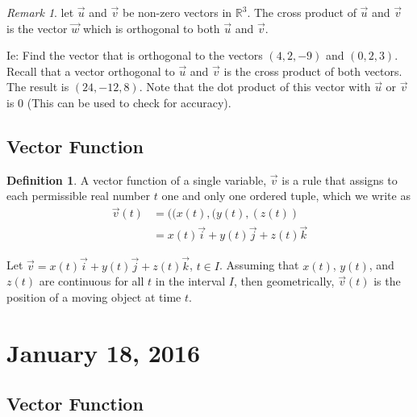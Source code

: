\documentclass[11pt]{article}
\theoremstyle{plain} %
\theoremstyle{definition}
\newtheorem*{definition}{Definition} %
\theoremstyle{example}
\theoremstyle{remark}
\newtheorem*{remark}{Remark}
\begin{document}
\begin{remark}
let $\vec{u}$ and $\vec{v}$ be non-zero vectors in $\mathbb R^3$. The cross product of $\vec{u}$ and $\vec{v}$ is the vector $\vec{w}$ which is orthogonal to both $\vec{u}$ and $\vec{v}$.
\end{remark}

Ie: Find the vector that is orthogonal to the vectors $(4, 2, -9)$ and $(0,2,3)$. Recall that a vector orthogonal to $\vec{u}$ and $\vec{v}$ is the cross product of both vectors. The result is $(24, -12,8 )$. Note that the dot product of this vector with $\vec{u}$ or $\vec{v}$ is 0 (This can be used to check for accuracy).



\subsection{Vector Function}

\begin{definition}
A vector function of a single variable, $\vec{v}$ is a rule that assigns to each permissible real number $t$ one and only one ordered tuple, which we write as 
\begin{align*}
	\vec{v}(t) &= ((x(t),(y(t),(z(t)) \\
	&= x(t)\vec{i}+y(t)\vec{j}+z(t)\vec{k} 
\end{align*}
\end{definition}

Let $\vec{v} =  x(t)\vec{i}+y(t)\vec{j}+z(t)\vec{k}$, $t \in I$. Assuming that $x(t)$, $y(t)$, and $z(t)$ are continuous for all $t$ in the interval $I$, then geometrically, $\vec{v}(t)$ is the position of a moving object at time $t$.



























\section{January 18, 2016}
\subsection{Vector Function}
\end{document}

